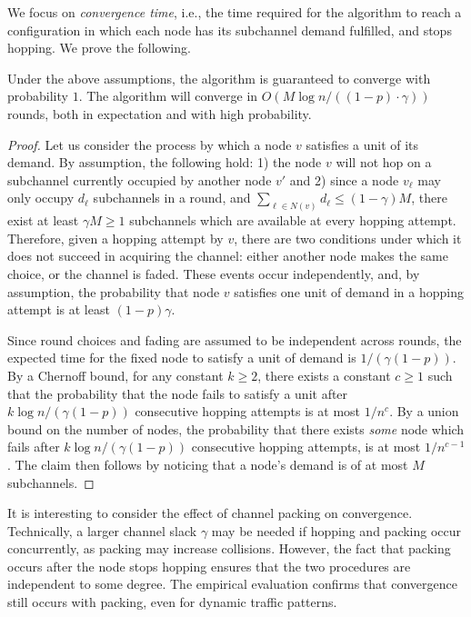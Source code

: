 We focus on \emph{convergence time}, i.e., the time required for the algorithm to reach a configuration in which each node has its subchannel demand fulfilled, and stops hopping. 
We prove the following. 

\begin{thm}
\label{thm:convergence}
	Under the above assumptions, the algorithm is guaranteed to converge with probability $1$. The algorithm will converge in $O( M \log n / ((1 - p) \cdot \gamma) )$ rounds, both in expectation and with high probability.   
\end{thm}
\begin{proof}
	Let us consider the process by which a node $v$ satisfies a unit of its demand. By assumption, the following hold: 1) the node $v$ will not hop on a subchannel currently occupied by another node $v'$ and 2) since a node $v_\ell$ may only occupy $d_\ell$ subchannels in a round, and $\sum_{\ell \in N(v)} d_\ell \leq (1 - \gamma) M$, there exist at least $\gamma M \geq 1$ subchannels which are available at every hopping attempt. Therefore, given a hopping attempt by $v$, there are two conditions under which it does not succeed in acquiring the channel: either another node makes the same choice, or the channel is faded. These events occur independently, and, by assumption, the probability that node $v$ satisfies one unit of demand in a hopping attempt is at least $(1 - p) \gamma$.  
	
	Since round choices and fading are assumed to be independent across rounds, the expected time for the fixed node to satisfy a unit of demand is $ 1 / (\gamma (1 - p))$. By a Chernoff bound, for any constant $k \geq 2$, there exists a constant $c \geq 1$ such that the probability that the node fails to satisfy a unit after $k \log n / (\gamma (1 - p) )$ consecutive hopping attempts is at most $1 / n^c$. 
	By a union bound on the number of nodes, the probability that there exists \emph{some} node which fails after $k \log n / (\gamma (1 - p ))$ consecutive hopping attempts, is at most $1 / n^{c - 1}$. 
	The claim then follows by noticing that a node's demand is of at most $M$ subchannels. 
\end{proof}


It is interesting to consider the effect of channel packing on convergence. 
Technically, a larger channel slack $\gamma$ may be needed if hopping and packing occur concurrently, as packing may increase collisions. 
However, the fact that packing occurs after the node stops hopping ensures that the two procedures are independent to some degree.
The empirical evaluation confirms that convergence still occurs with packing, even for dynamic traffic patterns. 




